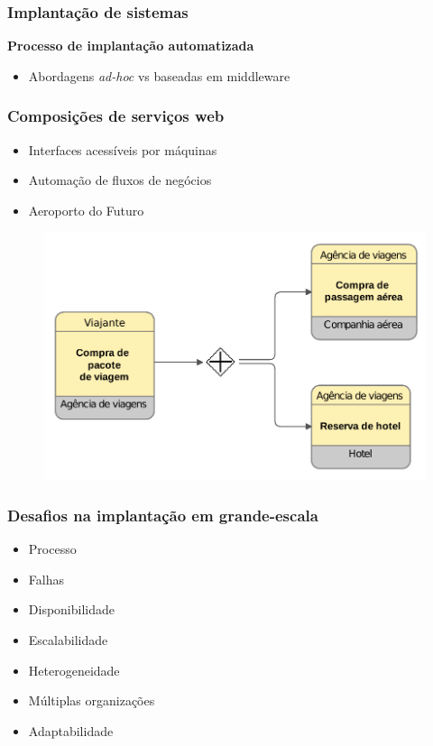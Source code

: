 \documentclass{beamer}
\newcommand\adhoc{\emph{ad-hoc}\xspace}
\newcommand\subtitulo[1]{{\large \textbf{#1}}}
\begin{document}

\begin{frame}
\frametitle{Implantação de sistemas}

\subtitulo{Processo de implantação automatizada}

\begin{itemize}
\item Abordagens \adhoc vs baseadas em middleware
\end{itemize}

\end{frame}


\begin{frame}
\frametitle{Composições de serviços web}

\begin{itemize}
\item Interfaces acessíveis por máquinas
\item Automação de fluxos de negócios
\item Aeroporto do Futuro
\end{itemize}

\begin{figure}
\includegraphics[width=0.7\linewidth]{img/bpmn2}
\end{figure}


\end{frame}


\begin{frame}
\frametitle{Desafios na implantação em grande-escala}

\begin{itemize}
\item Processo
\item Falhas
\item Disponibilidade
\item Escalabilidade
\item Heterogeneidade
\item Múltiplas organizações
\item Adaptabilidade
\end{itemize}

\end{frame}
\end{document}
